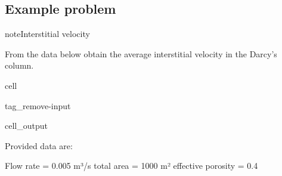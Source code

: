 \documentclass[letterpaper,10pt,english]{jupyterBook}
\begin{document}
\subsection{Example problem}
\label{\detokenize{content/flow/L4/14_darcy_law_K:id6}}
\begin{sphinxadmonition}{note}{Interstitial velocity}

\sphinxAtStartPar
From the data below obtain the average interstitial velocity in the Darcy’s column.
\end{sphinxadmonition}

\begin{sphinxuseclass}{cell}
\begin{sphinxuseclass}{tag_remove-input}\begin{sphinxVerbatimOutput}

\begin{sphinxuseclass}{cell_output}
\begin{sphinxVerbatim}[commandchars=\\\{\}]
Provided data are:

Flow rate = 0.005 m³/s
total area = 1000 m²
effective porosity = 0.4  
\end{sphinxVerbatim}

\end{sphinxuseclass}\end{sphinxVerbatimOutput}

\end{sphinxuseclass}
\end{sphinxuseclass}
\end{document}
